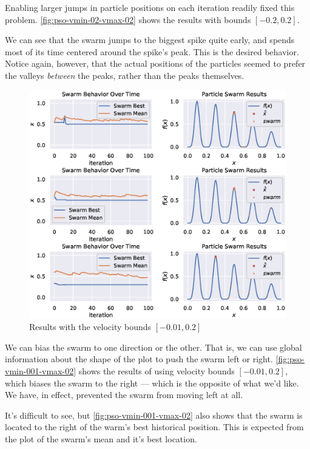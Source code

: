 \documentclass[12pt]{article}
\begin{document}
Enabling larger jumps in particle positions on each iteration readily fixed this problem.
\autoref{fig:pso-vmin-02-vmax-02} shows the results with bounds $[-0.2, 0.2]$.

We can see that the swarm jumps to the biggest spike quite early, and spends most of its time centered around the spike's peak.
This is the desired behavior.
Notice again, however, that the actual positions of the particles seemed to prefer the valleys \textit{between} the peaks, rather than the peaks themselves.

\begin{figure}[H]
    \centering
    \includegraphics[width=\textwidth]{figures/pso-v001-v02.eps}
    \caption{Results with the velocity bounds $[-0.01, 0.2]$}\label{fig:pso-vmin-001-vmax-02}
\end{figure}

We can bias the swarm to one direction or the other.
That is, we can use global information about the shape of the plot to push the swarm left or right.
\autoref{fig:pso-vmin-001-vmax-02} shows the results of using velocity bounds $[-0.01, 0.2]$, which
biases the swarm to the right --- which is the opposite of what we'd like.
We have, in effect, prevented the swarm from moving left at all.

It's difficult to see, but \autoref{fig:pso-vmin-001-vmax-02} also shows that the swarm is located to the right of the warm's best historical position.
This is expected from the plot of the swarm's mean and it's best location.
\end{document}
